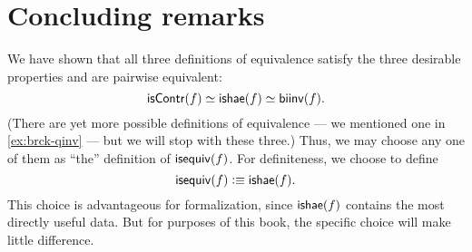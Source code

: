\section{Concluding remarks}
\label{sec:concluding-remarks}

We have shown that all three definitions of equivalence satisfy the three desirable properties and are pairwise equivalent:
\[ \mathsf{isContr}(f) \simeq \mathsf{ishae}(f) \simeq \mathsf{biinv}(f) . \]
(There are yet more possible definitions of equivalence --- we mentioned one in \autoref{ex:brck-qinv} --- but we will stop with these three.)
Thus, we may choose any one of them as ``the'' definition of $\mathsf{isequiv} (f)$.
For definiteness, we choose to define
\[ \mathsf{isequiv}(f) \vcentcolon\equiv \mathsf{ishae}(f).\]
This choice is advantageous for formalization, since $\mathsf{ishae}(f)$ contains the most directly useful data.
But for purposes of this book, the specific choice will make little difference.






